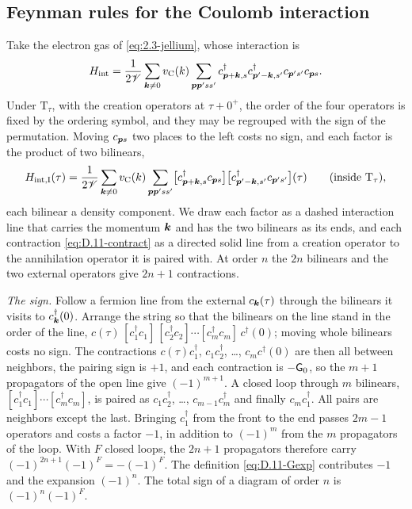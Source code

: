 \subsection*{Feynman rules for the Coulomb interaction}

Take the electron gas of \cref{eq:2.3-jellium}, whose interaction is
\begin{equation*}
  H_{\mathrm{int}} = \frac{1}{2\mathscr{V}}\sum_{\bm{k}\ne0}v_{\mathrm{C}}(k)\sum_{\bm{p}\bm{p}'ss'}c^\dagger_{\bm{p}+\bm{k},s}c^\dagger_{\bm{p}'-\bm{k},s'}c_{\bm{p}'s'}c_{\bm{p}s} .
\end{equation*} Under $\mathrm{T}_\tau$, with the creation operators at $\tau + 0^+$, the order of the four operators is fixed by the ordering symbol, and they may be regrouped with the sign of the permutation. Moving $c_{\bm{p}s}$ two places to the left costs no sign, and each factor is the product of two bilinears,
\begin{equation*}
  H_{\mathrm{int},\mathrm{I}}(\tau) = \frac{1}{2\mathscr{V}}\sum_{\bm{k}\ne0}v_{\mathrm{C}}(k)\sum_{\bm{p}\bm{p}'ss'}\bigl[c^\dagger_{\bm{p}+\bm{k},s}c_{\bm{p}s}\bigr]\bigl[c^\dagger_{\bm{p}'-\bm{k},s'}c_{\bm{p}'s'}\bigr](\tau) \qquad\text{(inside $\mathrm{T}_\tau$)} ,
\end{equation*}
each bilinear a density component. We draw each factor as a dashed interaction line that carries the momentum $\bm{k}$ and has the two bilinears as its ends, and each contraction \cref{eq:D.11-contract} as a directed solid line from a creation operator to the annihilation operator it is paired with. At order $n$ the $2n$ bilinears and the two external operators give $2n + 1$ contractions.

\emph{The sign.} Follow a fermion line from the external $c_{\bm{k}}(\tau)$ through the bilinears it visits to $c^\dagger_{\bm{k}}(0)$. Arrange the string so that the bilinears on the line stand in the order of the line, $c(\tau)\,[c^\dagger_1c_1]\,[c^\dagger_2c_2]\cdots[c^\dagger_mc_m]\,c^\dagger(0)$; moving whole bilinears costs no sign. The contractions $c(\tau)c^\dagger_1$, $c_1c^\dagger_2$, \dots, $c_mc^\dagger(0)$ are then all between neighbors, the pairing sign is $+1$, and each contraction is $-\mathsf{G}_0$, so the $m + 1$ propagators of the open line give $(-1)^{m+1}$. A closed loop through $m$ bilinears, $[c^\dagger_1c_1]\cdots[c^\dagger_mc_m]$, is paired as $c_1c^\dagger_2$, \dots, $c_{m-1}c^\dagger_m$ and finally $c_mc^\dagger_1$. All pairs are neighbors except the last. Bringing $c^\dagger_1$ from the front to the end passes $2m - 1$ operators and costs a factor $-1$, in addition to $(-1)^m$ from the $m$ propagators of the loop. With $F$ closed loops, the $2n + 1$ propagators therefore carry $(-1)^{2n+1}(-1)^F = -(-1)^F$. The definition \cref{eq:D.11-Gexp} contributes $-1$ and the expansion $(-1)^n$. The total sign of a diagram of order $n$ is $(-1)^n(-1)^F$.

